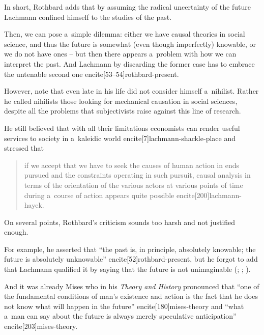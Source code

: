 {\begin{quote}
\end{quote}

In short, Rothbard adds that by assuming the radical uncertainty of the future Lachmann confined himself to the studies of the past.

Then, we can pose a~simple dilemma: either we have causal theories in social science, and thus the future is somewhat (even though imperfectly) knowable, or we do not have ones -- but then there appears a~problem with how we can interpret the past. And Lachmann by discarding the former case has to embrace the untenable second one encite[53--54]{rothbard-present}.



However, note that even late in his life \textcite[140]{lachmann1986market} did not consider himself a~nihilist. Rather he called nihilists those looking for mechanical causation in social sciences, despite all the problems that subjectivists raise against this line of research.

He still believed that with all their limitations economists can render useful services to society in a~kaleidic world encite[7]{lachmann-shackle-place} and stressed that

\begin{quote}

if we accept that we have to seek the causes of human action in ends pursued and the constraints operating in such pursuit, causal analysis in terms of the orientation of the various actors at various points of time during a~course of action appears quite possible encite[200]{lachmann-hayek}.

\end{quote}



On several points, Rothbard's criticism sounds too harsh and not justified enough.

For example, he asserted that ``the past is, in principle, absolutely knowable; the future is absolutely unknowable'' encite[52]{rothbard-present}, but he forgot to add that Lachmann qualified it by saying that the future is not unimaginable (\cite[194]{lachmann-hayek}; \citeyear[215]{lachmann-vicissitudes}; \citeyear[265]{lachmann-speculative-markets}).

And it was already Mises who in his \emph{Theory and History} pronounced that ``one of the fundamental conditions of man's existence and action is the fact that he does not know what will happen in the future'' encite[180]{mises-theory} and ``what a~man can say about the future is always merely speculative anticipation'' encite[203]{mises-theory}.

}

